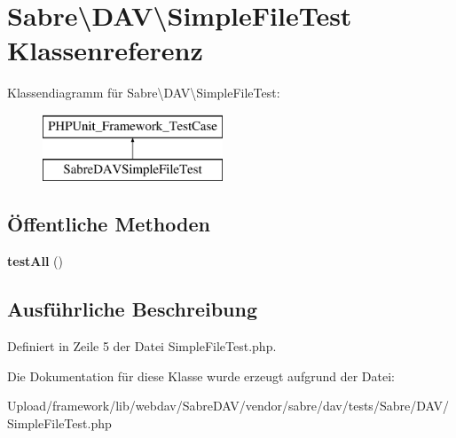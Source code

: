 \hypertarget{class_sabre_1_1_d_a_v_1_1_simple_file_test}{}\section{Sabre\textbackslash{}D\+AV\textbackslash{}Simple\+File\+Test Klassenreferenz}
\label{class_sabre_1_1_d_a_v_1_1_simple_file_test}
Klassendiagramm für Sabre\textbackslash{}D\+AV\textbackslash{}Simple\+File\+Test\+:\begin{figure}[H]
\begin{center}
\leavevmode
\includegraphics[height=2.000000cm]{class_sabre_1_1_d_a_v_1_1_simple_file_test}
\end{center}
\end{figure}
\subsection*{Öffentliche Methoden}
\begin{DoxyCompactItemize}
\item 
\mbox{\label{class_sabre_1_1_d_a_v_1_1_simple_file_test_a7e66a3b0974778592cc30f50bd1225f7}} 
{\bfseries test\+All} ()
\end{DoxyCompactItemize}


\subsection{Ausführliche Beschreibung}


Definiert in Zeile 5 der Datei Simple\+File\+Test.\+php.



Die Dokumentation für diese Klasse wurde erzeugt aufgrund der Datei\+:\begin{DoxyCompactItemize}
\item 
Upload/framework/lib/webdav/\+Sabre\+D\+A\+V/vendor/sabre/dav/tests/\+Sabre/\+D\+A\+V/Simple\+File\+Test.\+php\end{DoxyCompactItemize}
